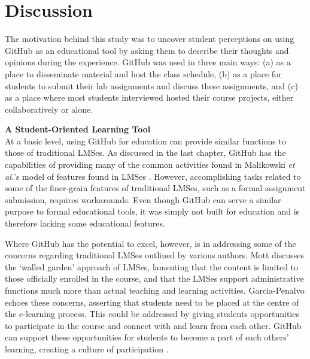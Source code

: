 \section{Discussion}

The motivation behind this study was to uncover student perceptions on using GitHub as an educational tool by asking them to describe their thoughts and opinions during the experience. GitHub was used in three main ways: (a) as a place to disseminate material and host the class schedule, (b) as a place for students to submit their lab assignments and discuss these assignments, and (c) as a place where most students interviewed hosted their course projects, either collaboratively or alone.

\textbf{A Student-Oriented Learning Tool} \\
At a basic level, using GitHub for education can provide similar functions to those of traditional LMSes. As discussed in the last chapter, GitHub has the capabilities of providing many of the common activities found in Malikowski \textit{et al.}'s model of features found in LMSes \cite{malikowski2007model}. However, accomplishing tasks related to some of the finer-grain features of traditional LMSes, such as a formal assignment submission, requires workarounds. Even though GitHub can serve a similar purpose to formal educational tools, it was simply not built for education and is therefore lacking some educational features.

Where GitHub has the potential to excel, however, is in addressing some of the concerns regarding traditional LMSes outlined by various authors. Mott \cite{mott2010envisioning} discusses the `walled garden' approach of LMSes, lamenting that the content is limited to those officially enrolled in the course, and that the LMSes support administrative functions much more than actual teaching and learning activities. Garcia-Penalvo \cite{garcia2011opening} echoes these concerns, asserting that students need to be placed at the centre of the e-learning process. This could be addressed by giving students opportunities to participate in the course and connect with and learn from each other. GitHub can support these opportunities for students to become a part of each others' learning, creating a culture of participation \cite{jenkins2009confronting}. \\

